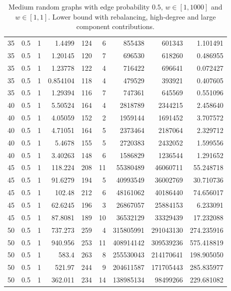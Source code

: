 \documentclass[a4paper,11pt]{article}
\begin{document}
\begin{table}
\begin{center}
\begin{tabular}{|rrr|r|r|rrr|r|}
35 & 0.5 & 1 & 1.4499 & 124 & 6 & 855438 & 601343 & 1.101491 \\
35 & 0.5 & 1 & 1.20145 & 120 & 7 & 696530 & 618260 & 0.486955 \\
35 & 0.5 & 1 & 1.23778 & 122 & 4 & 716422 & 696641 & 0.072427 \\
35 & 0.5 & 1 & 0.854104 & 118 & 4 & 479529 & 393921 & 0.407605 \\
35 & 0.5 & 1 & 1.29394 & 116 & 7 & 747361 & 645569 & 0.551096 \\
40 & 0.5 & 1 & 5.50524 & 164 & 4 & 2818789 & 2344215 & 2.458640 \\
40 & 0.5 & 1 & 4.05059 & 152 & 2 & 1959144 & 1691452 & 3.707572 \\
40 & 0.5 & 1 & 4.71051 & 164 & 5 & 2373464 & 2187064 & 2.329712 \\
40 & 0.5 & 1 & 5.4678 & 155 & 5 & 2720383 & 2432052 & 1.599556 \\
40 & 0.5 & 1 & 3.40263 & 148 & 6 & 1586829 & 1236544 & 1.291652 \\
45 & 0.5 & 1 & 118.224 & 208 & 11 & 55380489 & 46060711 & 55.248718 \\
45 & 0.5 & 1 & 91.6279 & 194 & 5 & 40993549 & 36002769 & 30.710736 \\
45 & 0.5 & 1 & 102.48 & 212 & 6 & 48161062 & 40186440 & 74.656017 \\
45 & 0.5 & 1 & 62.6245 & 196 & 3 & 26867057 & 25884153 & 6.233091 \\
45 & 0.5 & 1 & 87.8081 & 189 & 10 & 36532129 & 33329439 & 17.232088 \\
50 & 0.5 & 1 & 737.273 & 259 & 4 & 315805991 & 291043130 & 274.235916 \\
50 & 0.5 & 1 & 940.956 & 253 & 11 & 408914142 & 309539236 & 575.418819 \\
50 & 0.5 & 1 & 583.4 & 263 & 8 & 255530043 & 214170641 & 198.905050 \\
50 & 0.5 & 1 & 521.97 & 244 & 9 & 204611587 & 171705443 & 285.835977 \\
50 & 0.5 & 1 & 362.011 & 234 & 14 & 138985134 & 98499266 & 229.681082 \\
\hline
\end{tabular}
\end{center}
\caption{Medium random graphs with edge probability $0.5$,
  $w\in[1,1000]$ and $w\in[1,1]$. Lower bound with rebalancing,
  high-degree and large component contributions.}
\label{tab:medium-all}
\end{table}
\end{document}
